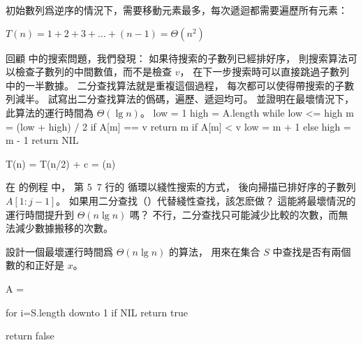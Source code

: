 初始數列爲逆序的情況下，需要移動元素最多，每次遞迴都需要遍歷所有元素：

$T(n) = 1 + 2 + 3 + ... + (n-1) = \Theta(n^2)$
\stopANSWER

回顧 中的搜索問題，我們發現：
如果待搜索的子數列已經排好序，
則搜索算法可以檢查子數列的中間數值，而不是檢查 $v$，
在下一步搜索時可以直接跳過子數列中的一半數據。
二分查找算法就是重複這個過程，
每次都可以使得帶搜索的子數列減半。
試寫出二分查找算法的僞碼，遍歷、遞迴均可。
並證明在最壞情況下，此算法的運行時間為 $\Theta(\lg n)$。
\stopEXERCISE
\startANSWER
{}
\startCLRSCODE
low = 1
high = A.length
while low <= high
	m = (low + high) / 2
	if A[m] == v
		return m
	if A[m] < v
		low = m + 1
	else
		high = m - 1
return NIL
\stopCLRSCODE

\startformula
T(n) = T(n/2) + c = \Theta(\lg n)
\stopformula
\stopANSWER

\startEXERCISE
在 的例程  中，
第 5~7 行的  循環以綫性搜索的方式，
後向掃描已排好序的子數列 $A[1:j-1]$。
如果用二分查找（）代替綫性查找，該怎麽做？
這能將最壞情況的運行時間提升到 $\Theta(n\lg n)$ 嗎？
\stopEXERCISE
\startANSWER
不行，二分查找只可能減少比較的次數，而無法減少數據搬移的次數。
\stopANSWER

\startEXERCISE
設計一個最壞運行時間爲 $\Theta(n\lg n)$ 的算法，
用來在集合 $S$ 中查找是否有兩個數的和正好是 $x$。
\stopEXERCISE

\startANSWER
{}
\startCLRSCODE
A = 

for i=S.length downto 1
	if  \ne NIL
		return true

return false
\stopCLRSCODE
\stopANSWER

\stopsection
